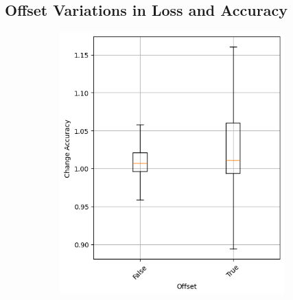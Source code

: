 \subsection{Offset Variations in Loss and Accuracy}\label{subsec:offset-variations-in-loss-and-accuracy}
\begin{figure}
    \begin{subfigure}{0.5\textwidth}
        \centering
        \includegraphics[width=0.95\textwidth]{plots/Offset_Trained_accuracy.png}
    \end{subfigure}
    \begin{subfigure}{0.5\textwidth}
        \centering

\end{subfigure}
\end{figure}
